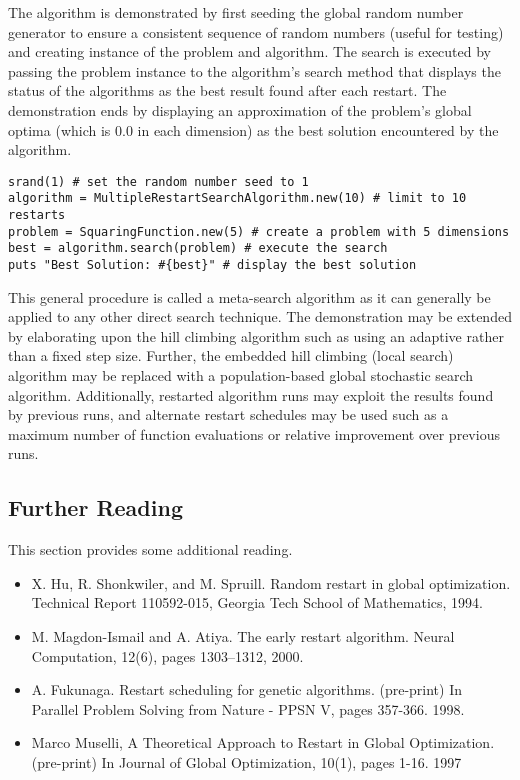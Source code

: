 The algorithm is demonstrated by first seeding the global random number generator to ensure a consistent sequence of random numbers (useful for testing) and creating instance of the problem and algorithm. The search is executed by passing the problem instance to the algorithm's search method that displays the status of the algorithms as the best result found after each restart. The demonstration ends by displaying an approximation of the problem's global optima (which is 0.0 in each dimension) as the best solution encountered by the algorithm.

\begin{lstlisting}
srand(1) # set the random number seed to 1
algorithm = MultipleRestartSearchAlgorithm.new(10) # limit to 10 restarts
problem = SquaringFunction.new(5) # create a problem with 5 dimensions
best = algorithm.search(problem) # execute the search
puts "Best Solution: #{best}" # display the best solution
\end{lstlisting}

This general procedure is called a meta-search algorithm as it can generally be applied to any other direct search technique. The demonstration may be extended by elaborating upon the hill climbing algorithm such as using an adaptive rather than a fixed step size. Further, the embedded hill climbing (local search) algorithm may be replaced with a population-based global stochastic search algorithm. Additionally, restarted algorithm runs may exploit the results found by previous runs, and alternate restart schedules may be used such as a maximum number of function evaluations or relative improvement over previous runs.

\subsection{Further Reading}
This section provides some additional reading.

\begin{itemize}
	\item X. Hu, R. Shonkwiler, and M. Spruill. Random restart in global optimization. Technical Report 110592-015, Georgia Tech School of Mathematics, 1994.
	\item M. Magdon-Ismail and A. Atiya. The early restart algorithm. Neural Computation, 12(6), pages 1303–1312, 2000.
	\item A. Fukunaga. Restart scheduling for genetic algorithms. (pre-print) In Parallel Problem Solving from Nature - PPSN V, pages 357-366. 1998.
	\item Marco Muselli, A Theoretical Approach to Restart in Global Optimization. (pre-print) In Journal of Global Optimization, 10(1), pages 1-16. 1997
\end{itemize}
